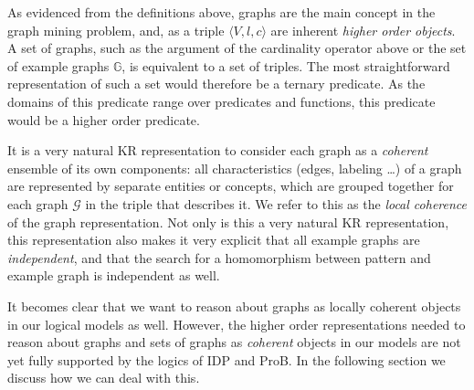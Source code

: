 \documentclass{article}
\theoremstyle{definition}
\newcommand{\triple}[1]{\ensuremath{\langle #1 \rangle}}
\newcommand{\graph}[1]{\ensuremath{\mathcal{#1}}}
\newcommand{\graphset}[1]{\ensuremath{\mathbb{#1}}}
\begin{document}
As evidenced from the definitions above, graphs are the main concept in the graph mining problem, and, as a triple $\triple{V,l,c}$ are inherent \emph{higher order objects}.
A set of graphs, such as the argument of the cardinality operator above or the set of example graphs $\graphset{G}$, is equivalent to a set of triples.
The most straightforward representation of such a set would therefore be a ternary predicate.
As the domains of this predicate range over predicates and functions, this predicate would be a higher order predicate.

It is a very natural KR representation to consider each graph as a \emph{coherent} ensemble of its own components: all characteristics (edges, labeling \ldots) of a graph are represented by separate entities or concepts, which are grouped together for each graph $\graph{G}$ in the triple that describes it. We refer to this as the \emph{local coherence} of the graph representation.
Not only is this a very natural KR representation, this representation also makes it very explicit that all example graphs are \emph{independent}, and that the search for a homomorphism between pattern and example graph is independent as well.

It becomes clear that we want to reason about graphs as locally coherent objects in our logical models as well.
However, the higher order representations needed to reason about graphs and sets of graphs as \emph{coherent} objects in our models are not yet fully supported by the logics of IDP and ProB.
In the following section we discuss how we can deal with this.


\end{document}
